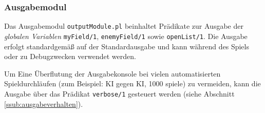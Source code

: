 	
	
	

\subsubsection{Ausgabemodul}
		Das Ausgabemodul \texttt{outputModule.pl} beinhaltet Prädikate zur Ausgabe der \textit{globalen Variablen} \texttt{myField/1},
		\texttt{enemyField/1} sowie \texttt{openList/1}. Die Ausgabe erfolgt standardgemäß auf der Standardausgabe und kann während des Spiels oder zu
		Debugzwecken verwendet werden.

		Um Eine Überflutung der Ausgabekonsole bei vielen automatisierten Spieldurchläufen (zum Beispiel: KI gegen KI, 1000 spiele) zu vermeiden, kann 
		die Ausgabe über das Prädikat \texttt{verbose/1} gesteuert werden (siehe Abschnitt \ref{ssub:ausgabeverhalten}).
